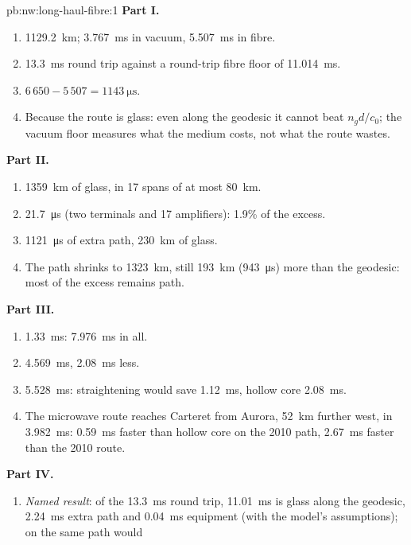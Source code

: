 \begin{solution}{pb:nw:long-haul-fibre:1}
\textbf{Part I.}
\begin{enumerate}
\item \qty{1129.2}{\kilo\metre}; \qty{3.767}{\milli\second} in vacuum, \qty{5.507}{\milli\second} in fibre.
\item \qty{13.3}{\milli\second} round trip against a round-trip fibre floor of \qty{11.014}{\milli\second}.
\item $6\,650 - 5\,507 = \qty{1143}{\micro\second}$.
\item Because the route is glass: even along the geodesic it cannot beat $n_g d/c_0$; the vacuum floor measures what the medium costs, not what
  the route wastes.
\end{enumerate}
\textbf{Part II.}
\begin{enumerate}[resume]
\item \qty{1359}{\kilo\metre} of glass, in 17 spans of at most \qty{80}{\kilo\metre}.
\item \qty{21.7}{\micro\second} (two terminals and 17 amplifiers): 1.9\% of the excess.
\item \qty{1121}{\micro\second} of extra path, \qty{230}{\kilo\metre} of glass.
\item The path shrinks to \qty{1323}{\kilo\metre}, still \qty{193}{\kilo\metre} (\qty{943}{\micro\second}) more than the geodesic: most of the
  excess remains path.
\end{enumerate}
\textbf{Part III.}
\begin{enumerate}[resume]
\item \qty{1.33}{\milli\second}: \qty{7.976}{\milli\second} in all.
\item \qty{4.569}{\milli\second}, \qty{2.08}{\milli\second} less.
\item \qty{5.528}{\milli\second}: straightening would save \qty{1.12}{\milli\second}, hollow core \qty{2.08}{\milli\second}.
\item The microwave route reaches Carteret from Aurora, \qty{52}{\kilo\metre} further west, in \qty{3.982}{\milli\second}: \qty{0.59}{\milli\second}
  faster than hollow core on the 2010 path, \qty{2.67}{\milli\second} faster than the 2010 route.
\end{enumerate}
\textbf{Part IV.}
\begin{enumerate}[resume]
\item \emph{Named result}: of the \qty{13.3}{\milli\second} round trip, \qty{11.01}{\milli\second} is glass along the geodesic,
  \qty{2.24}{\milli\second} extra path and \qty{0.04}{\milli\second} equipment (with the model's assumptions);  on the same path would

\end{enumerate}
\end{solution}
